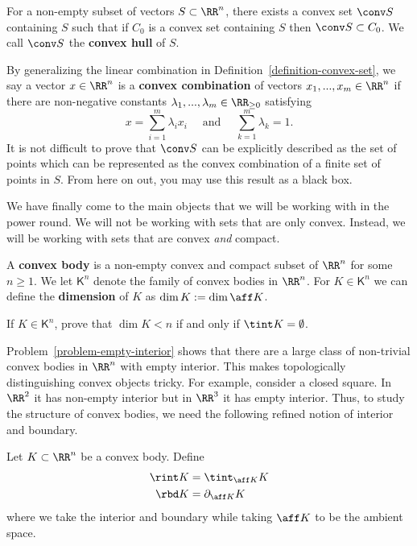 \documentclass[11pt]{article}
\begin{document}
\begin{defn} \label{definition-convex-hull}
    For a non-empty subset of vectors $S \subset \RR^n$, there exists a convex set $\conv S$ containing $S$ such that if $C_0$ is a convex set containing $S$ then $\conv S \subset C_0$. We call $\conv S$ the \textbf{convex hull} of $S$.
\end{defn}

\begin{remark}
By generalizing the linear combination in Definition~\ref{definition-convex-set}, we say a vector $x \in \RR^n$ is a \textbf{convex combination} of vectors $x_1, ..., x_m \in \RR^n$ if there are non-negative constants $\lambda_1, ..., \lambda_m \in \RR_{\geq 0}$ satisfying 
\[
    x = \sum_{i = 1}^m \lambda_i x_i \quad \text{ and } \quad \sum_{k = 1}^m \lambda_k = 1.
\]
It is not difficult to prove that $\conv S$ can be explicitly described as the set of points which can be represented as the convex combination of a finite set of points in $S$. From here on out, you may use this result as a black box. 
\end{remark}

We have finally come to the main objects that we will be working with in the power round. We will not be working with sets that are only convex. Instead, we will be working with sets that are convex \textit{and} compact. 

\begin{defn}
    A \textbf{convex body} is a non-empty convex and compact subset of $\RR^n$ for some $n \geq 1$. We let $\mathsf{K}^n$ denote the family of convex bodies in $\RR^n$. For $K \in \mathsf{K}^n$ we can define the \textbf{dimension} of $K$ as $\dim K := \dim \aff K$. 
\end{defn}

\begin{prob} [10 points] \label{problem-empty-interior}
    If $K \in \mathsf{K}^n$, prove that $\dim K < n$ if and only if $\tint K = \emptyset$. 
\end{prob}

Problem~\ref{problem-empty-interior} shows that there are a large class of non-trivial convex bodies in $\RR^n$ with empty interior. This makes topologically distinguishing convex objects tricky. For example, consider a closed square. In $\RR^2$ it has non-empty interior but in $\RR^3$ it has empty interior. Thus, to study the structure of convex bodies, we need the following refined notion of interior and boundary. 

\begin{defn} \label{definition-relint-relbd}
    Let $K \subset \RR^n$ be a convex body. Define
    \begin{align*}
        \rint K & = \tint_{\aff K} K \\
        \rbd K & = \partial_{\aff K} K
    \end{align*}
    where we take the interior and boundary while taking $\aff K$ to be the ambient space. 
\end{defn}
\end{document}
